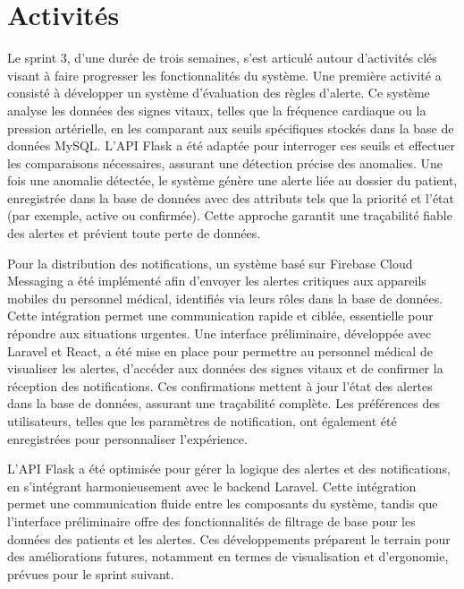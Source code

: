 \section{Activités}
Le sprint 3, d’une durée de trois semaines, s’est articulé autour d’activités clés visant à faire progresser les fonctionnalités du système. Une première activité a consisté à développer un système d’évaluation des règles d’alerte. Ce système analyse les données des signes vitaux, telles que la fréquence cardiaque ou la pression artérielle, en les comparant aux seuils spécifiques stockés dans la base de données MySQL. L’API Flask a été adaptée pour interroger ces seuils et effectuer les comparaisons nécessaires, assurant une détection précise des anomalies. Une fois une anomalie détectée, le système génère une alerte liée au dossier du patient, enregistrée dans la base de données avec des attributs tels que la priorité et l’état (par exemple, active ou confirmée). Cette approche garantit une traçabilité fiable des alertes et prévient toute perte de données.

Pour la distribution des notifications, un système basé sur Firebase Cloud Messaging a été implémenté afin d’envoyer les alertes critiques aux appareils mobiles du personnel médical, identifiés via leurs rôles dans la base de données. Cette intégration permet une communication rapide et ciblée, essentielle pour répondre aux situations urgentes. Une interface préliminaire, développée avec Laravel et React, a été mise en place pour permettre au personnel médical de visualiser les alertes, d’accéder aux données des signes vitaux et de confirmer la réception des notifications. Ces confirmations mettent à jour l’état des alertes dans la base de données, assurant une traçabilité complète. Les préférences des utilisateurs, telles que les paramètres de notification, ont également été enregistrées pour personnaliser l’expérience.

L’API Flask a été optimisée pour gérer la logique des alertes et des notifications, en s’intégrant harmonieusement avec le backend Laravel. Cette intégration permet une communication fluide entre les composants du système, tandis que l’interface préliminaire offre des fonctionnalités de filtrage de base pour les données des patients et les alertes. Ces développements préparent le terrain pour des améliorations futures, notamment en termes de visualisation et d’ergonomie, prévues pour le sprint suivant.

